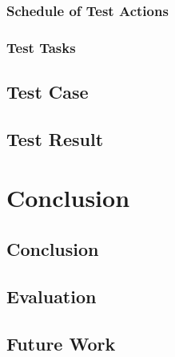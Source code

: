 \documentclass[a4paper, 12pt, oneside]{book}
\begin{document}
			\subsection{Schedule of Test Actions}
			\subsection{Test Tasks}
		\section{Test Case}
		\section{Test Result}
		\newpage	
	\chapter{Conclusion}
		\section{Conclusion}
		\section{Evaluation}
		\section{Future Work}
	\newpage

	
	

\end{document}
